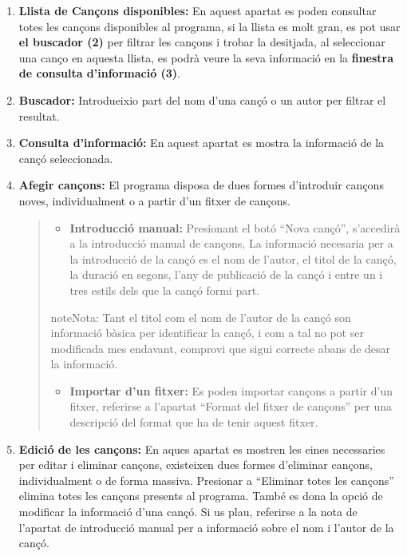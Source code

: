 \documentclass[letterpaper,10pt,oneside]{sphinxmanual}
\begin{document}
\begin{enumerate}
\item {} 
\textbf{Llista de Cançons disponibles:} En aquest apartat es poden consultar totes les cançons disponibles al programa, si la llista es molt gran, es pot usar \textbf{el buscador (2)} per filtrar les cançons i trobar la desitjada, al seleccionar una canço en aquesta llista, es podrà veure la seva informació en la \textbf{finestra de consulta d'informació (3)}.

\item {} 
\textbf{Buscador:} Introdueixio part del nom d'una cançó o un autor per filtrar el resultat.

\item {} 
\textbf{Consulta d'informació:} En aquest apartat es mostra la informació de la cançó seleccionada.

\item {} 
\textbf{Afegir cançons:} El programa disposa de dues formes d'introduir cançons noves, individualment o a partir d'un fitxer de cançons.
\begin{quote}
\begin{itemize}
\item {} 
\textbf{Introducció manual:} Presionant el botó ``Nova cançó'', s'accedirà a la introducció manual de cançons, La informació necesaria per a la introducció de la cançó es el nom de l'autor, el titol de la cançó, la duració en segons, l'any de publicació de la cançó i entre un i tres estils dels que la cançó formi part.

\end{itemize}

\begin{notice}{note}{Nota:}
Tant el titol com el nom de l'autor de la cançó son informació bàsica per identificar la cançó, i com a tal no pot ser modificada mes endavant, comprovi que sigui correcte abans de desar la informació.
\end{notice}
\begin{itemize}
\item {} 
\textbf{Importar d'un fitxer:} Es poden importar cançons a partir d'un fitxer, referirse a l'apartat ``Format del fitxer de cançons'' per una descripció del format que ha de tenir aquest fitxer.

\end{itemize}
\end{quote}

\item {} 
\textbf{Edició de les cançons:} En aques apartat es mostren les eines necessaries per editar i eliminar cançons, existeixen dues formes d'eliminar cançons, individualment o de forma massiva. Presionar a ``Eliminar totes les cançons'' elimina totes les cançons presents al programa. També es dona la opció de modificar la informació d'una cançó. Si us plau, referirse a la nota de l'apartat de introducció manual per a informació sobre el nom i l'autor de la cançó.

\end{enumerate}
\end{document}
